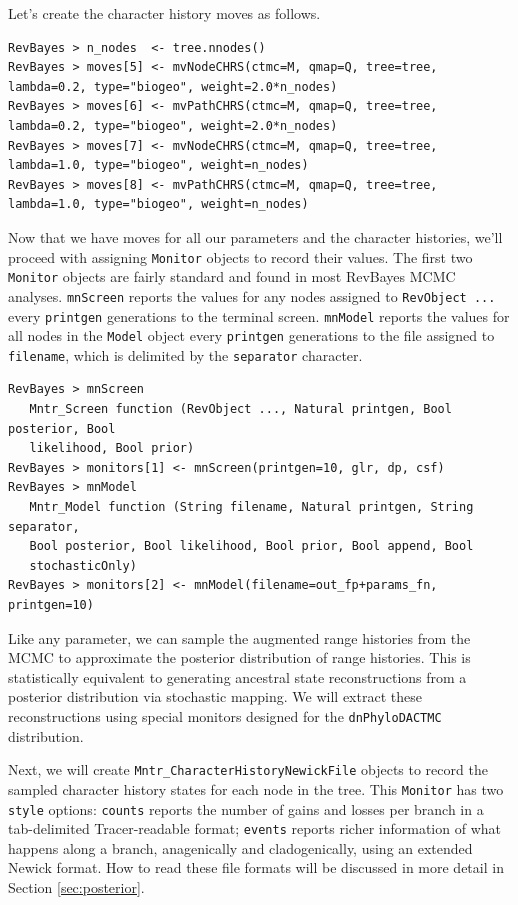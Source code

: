 \documentclass[11pt]{article}
\begin{document}
Let's create the character history moves as follows.

\begin{snugshade}
\begin{lstlisting}
RevBayes > n_nodes  <- tree.nnodes()
RevBayes > moves[5] <- mvNodeCHRS(ctmc=M, qmap=Q, tree=tree, lambda=0.2, type="biogeo", weight=2.0*n_nodes)
RevBayes > moves[6] <- mvPathCHRS(ctmc=M, qmap=Q, tree=tree, lambda=0.2, type="biogeo", weight=2.0*n_nodes)
RevBayes > moves[7] <- mvNodeCHRS(ctmc=M, qmap=Q, tree=tree, lambda=1.0, type="biogeo", weight=n_nodes)
RevBayes > moves[8] <- mvPathCHRS(ctmc=M, qmap=Q, tree=tree, lambda=1.0, type="biogeo", weight=n_nodes)
\end{lstlisting}
\end{snugshade}

Now that we have moves for all our parameters and the character histories, we'll proceed with assigning {\tt Monitor} objects to record their values.
The first two {\tt Monitor} objects are fairly standard and found in most RevBayes MCMC analyses.
{\tt mnScreen} reports the values for any nodes assigned to {\tt RevObject ...} every {\tt printgen} generations to the terminal screen.
{\tt mnModel} reports the values for all nodes in the {\tt Model} object every {\tt printgen} generations to the file assigned to {\tt filename}, which is delimited by the {\tt separator} character.

\begin{snugshade}
\begin{lstlisting}
RevBayes > mnScreen
   Mntr_Screen function (RevObject ..., Natural printgen, Bool posterior, Bool
   likelihood, Bool prior)
RevBayes > monitors[1] <- mnScreen(printgen=10, glr, dp, csf)
RevBayes > mnModel
   Mntr_Model function (String filename, Natural printgen, String separator,
   Bool posterior, Bool likelihood, Bool prior, Bool append, Bool
   stochasticOnly)
RevBayes > monitors[2] <- mnModel(filename=out_fp+params_fn, printgen=10)
\end{lstlisting}
\end{snugshade}

Like any parameter, we can sample the augmented range histories from the MCMC to approximate the posterior distribution of range histories.
This is statistically equivalent to generating ancestral state reconstructions from a posterior distribution via stochastic mapping.
We will extract these reconstructions using special monitors designed for the {\tt dnPhyloDACTMC} distribution.

Next, we will create {\tt Mntr\_CharacterHistoryNewickFile} objects to record the sampled character history states for each node in the tree.
This {\tt Monitor} has two {\tt style} options: {\tt counts} reports the number of gains and losses per branch in a tab-delimited Tracer-readable format;  {\tt events} reports richer information of what happens along a branch, anagenically and cladogenically, using an extended Newick format.
How to read these file formats will be discussed in more detail in Section \ref{sec:posterior}.
\end{document}
